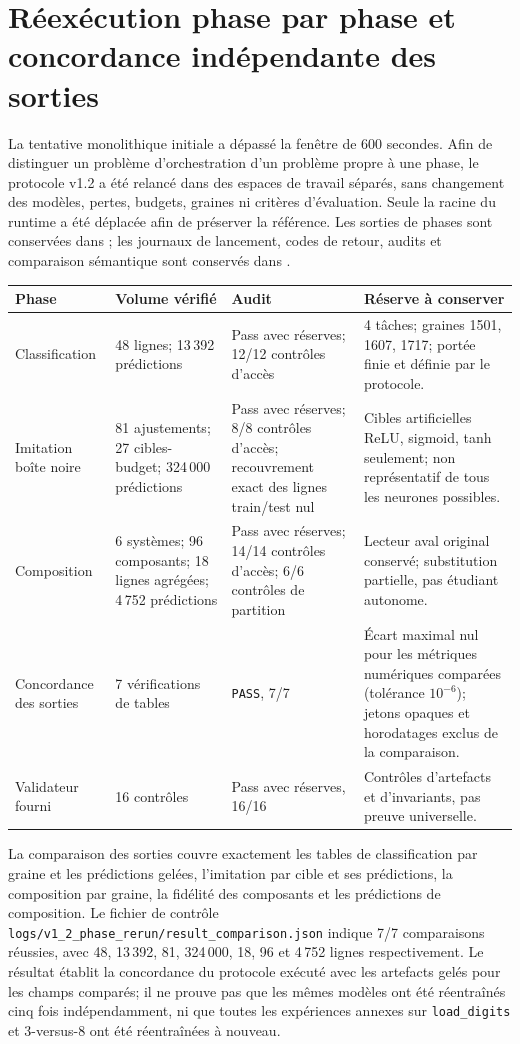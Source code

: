\documentclass[11pt,a4paper,oneside]{report}
\begin{document}
\section{Réexécution phase par phase et concordance indépendante des sorties}
La tentative monolithique initiale a dépassé la fenêtre de 600 secondes. Afin de distinguer un problème d'orchestration d'un problème propre à une phase, le protocole v1.2 a été relancé dans des espaces de travail séparés, sans changement des modèles, pertes, budgets, graines ni critères d'évaluation. Seule la racine du runtime a été déplacée afin de préserver la référence. Les sorties de phases sont conservées dans ; les journaux de lancement, codes de retour, audits et comparaison sémantique sont conservés dans .

\begin{center}
\small
\begin{tabular}{p{2.8cm}p{2.6cm}p{2.2cm}p{5.0cm}}
\toprule
Phase & Volume vérifié & Audit & Réserve à conserver\\
\midrule
Classification & 48 lignes; 13\,392 prédictions & Pass avec réserves; 12/12 contrôles d'accès & 4 tâches; graines 1501, 1607, 1717; portée finie et définie par le protocole.\\
Imitation boîte noire & 81 ajustements; 27 cibles-budget; 324\,000 prédictions & Pass avec réserves; 8/8 contrôles d'accès; recouvrement exact des lignes train/test nul & Cibles artificielles ReLU, sigmoid, tanh seulement; non représentatif de tous les neurones possibles.\\
Composition & 6 systèmes; 96 composants; 18 lignes agrégées; 4\,752 prédictions & Pass avec réserves; 14/14 contrôles d'accès; 6/6 contrôles de partition & Lecteur aval original conservé; substitution partielle, pas étudiant autonome.\\
Concordance des sorties & 7 vérifications de tables & \texttt{PASS}, 7/7 & Écart maximal nul pour les métriques numériques comparées (tolérance \(10^{-6}\)); jetons opaques et horodatages exclus de la comparaison.\\
Validateur fourni & 16 contrôles & Pass avec réserves, 16/16 & Contrôles d'artefacts et d'invariants, pas preuve universelle.\\
\bottomrule
\end{tabular}
\end{center}

La comparaison des sorties couvre exactement les tables de classification par graine et les prédictions gelées, l'imitation par cible et ses prédictions, la composition par graine, la fidélité des composants et les prédictions de composition. Le fichier de contrôle \texttt{logs/v1\_2\_phase\_rerun/result\_comparison.json} indique 7/7 comparaisons réussies, avec 48, 13\,392, 81, 324\,000, 18, 96 et 4\,752 lignes respectivement. Le résultat établit la concordance du protocole exécuté avec les artefacts gelés pour les champs comparés; il ne prouve pas que les mêmes modèles ont été réentraînés cinq fois indépendamment, ni que toutes les expériences annexes sur \texttt{load\_digits} et 3-versus-8 ont été réentraînées à nouveau.
\end{document}
